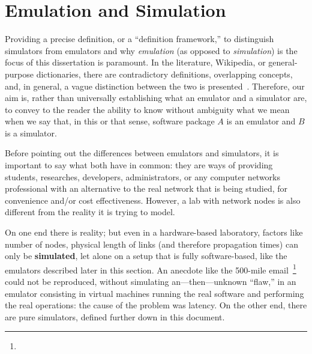 \section{Emulation and Simulation}
\label{sec:leavingemulationandsimulation}

Providing a precise definition, or a ``definition framework,'' to distinguish simulators from emulators and why \emph{emulation} (as opposed to \emph{simulation}) is the focus of this dissertation is paramount.
In the literature, Wikipedia, or general-purpose dictionaries, there are contradictory definitions, overlapping concepts, and, in general, a vague distinction between the two is presented~\cite{netsimoremu}.
Therefore, our aim is, rather than universally establishing what an emulator and a simulator are, to convey to the reader the ability to know without ambiguity what we mean when we say that, in this or that sense, software package $A$ is an emulator and $B$ is a simulator.

Before pointing out the differences between emulators and simulators, it is important to say what both have in common: they are ways of providing students, researches, developers, administrators, or any computer networks professional with an alternative to the real network that is being studied, for convenience and/or cost effectiveness.
However, a lab with network nodes is also different from the reality it is trying to model.

On one end there is reality; but even in a hardware-based laboratory, factors like number of nodes, physical length of links (and therefore propagation times) can only be \textbf{simulated}, let alone on a setup that is fully software-based, like the emulators described later in this section.
An anecdote like the 500-mile email~\footnote{} could not be reproduced, without simulating an---then---unknown ``flaw,'' in an emulator consisting in virtual machines running the real software and performing the real operations: the cause of the problem was latency.
On the other end, there are pure simulators, defined further down in this document.


